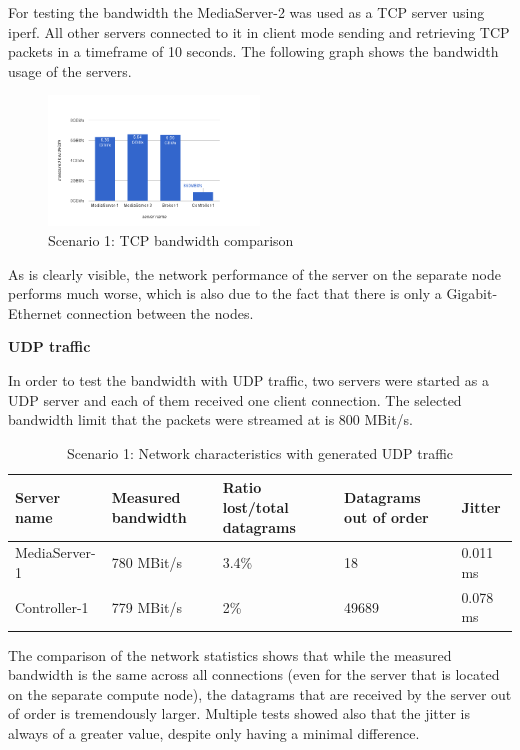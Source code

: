 For testing the bandwidth the MediaServer-2 was used as a TCP server using iperf. All other servers connected to it in client mode sending and retrieving TCP packets in a timeframe of 10 seconds. The following graph shows the bandwidth usage of the servers.

\begin{figure}[H]
\centering

\includegraphics[width=0.5\textwidth]{images/evaluation/testbed_scenario1_bw}

\caption{Scenario 1: TCP bandwidth comparison}
\end{figure}

As is clearly visible, the network performance of the server on the separate node performs much worse, which is also due to the fact that there is only a Gigabit-Ethernet connection between the nodes.

\newpage
\textbf{UDP traffic}

In order to test the bandwidth with UDP traffic, two servers were started as a UDP server and each of them received one client connection. The selected bandwidth limit that the packets were streamed at is 800 MBit/s.

\begin{table}[H]
\centering

\begin{tabularx}{\textwidth}{ |X|X|X|X|X| }
\hline Server name & Measured bandwidth & Ratio lost/total datagrams & Datagrams out of order & Jitter \\ 
\hline MediaServer-1 & 780 MBit/s & 3.4\% & 18 & 0.011 ms\\ 
\hline Controller-1 & 779 MBit/s & 2\% & 49689 & 0.078 ms \\ 
\hline 
\end{tabularx}

\caption{Scenario 1: Network characteristics with generated UDP traffic}
\end{table}

The comparison of the network statistics shows that while the measured bandwidth is the same across all connections (even for the server that is located on the separate compute node), the datagrams that are received by the server out of order is tremendously larger. Multiple tests showed also that the jitter is always of a greater value, despite only having a minimal difference.


